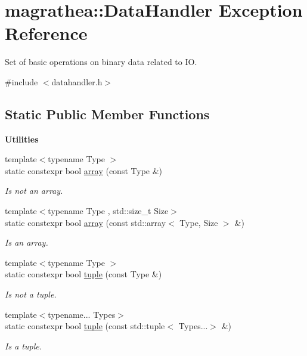 \hypertarget{exceptionmagrathea_1_1DataHandler}{\section{magrathea\-:\-:Data\-Handler Exception Reference}
\label{exceptionmagrathea_1_1DataHandler}
}


Set of basic operations on binary data related to I\-O.  




{\ttfamily \#include $<$datahandler.\-h$>$}

\subsection*{Static Public Member Functions}
\begin{Indent}{\bf Utilities}\par
\begin{DoxyCompactItemize}
\item 
{\footnotesize template$<$typename Type $>$ }\\static constexpr bool \hyperlink{exceptionmagrathea_1_1DataHandler_a03a3af0a1f2adce31cd189191a420ac0}{array} (const Type \&)
\begin{DoxyCompactList}\small\item\em Is not an array. \end{DoxyCompactList}\item 
{\footnotesize template$<$typename Type , std\-::size\-\_\-t Size$>$ }\\static constexpr bool \hyperlink{exceptionmagrathea_1_1DataHandler_ab9d06cd95b4986d4760c6650b1642b60}{array} (const std\-::array$<$ Type, Size $>$ \&)
\begin{DoxyCompactList}\small\item\em Is an array. \end{DoxyCompactList}\item 
{\footnotesize template$<$typename Type $>$ }\\static constexpr bool \hyperlink{exceptionmagrathea_1_1DataHandler_a40c596c3e2059535c1649654fe8a7aa0}{tuple} (const Type \&)
\begin{DoxyCompactList}\small\item\em Is not a tuple. \end{DoxyCompactList}\item 
{\footnotesize template$<$typename... Types$>$ }\\static constexpr bool \hyperlink{exceptionmagrathea_1_1DataHandler_a2249708da73286fe5f5a695ed202fa8c}{tuple} (const std\-::tuple$<$ Types...$>$ \&)
\begin{DoxyCompactList}\small\item\em Is a tuple. \end{DoxyCompactList}\end{DoxyCompactItemize}
\end{Indent}
